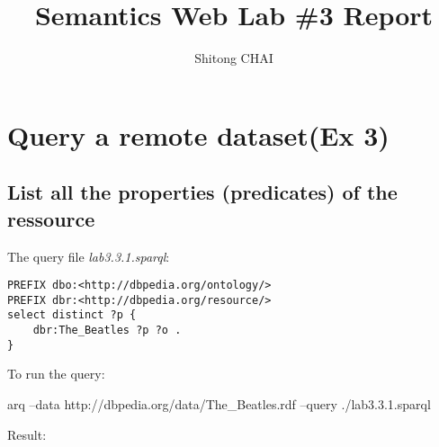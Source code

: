 \documentclass[a4paper, 12pt]{report}
\title{Semantics Web Lab \#3 Report}
\date{}
\author{Shitong CHAI}
\begin{document}
\maketitle
\tableofcontents

\chapter{Query a remote dataset(Ex 3)}
\section{List all the properties (predicates) of the ressource}
The query file \emph{lab3.3.1.sparql}:
\begin{lstlisting}[frame=single]
PREFIX dbo:<http://dbpedia.org/ontology/>
PREFIX dbr:<http://dbpedia.org/resource/>
select distinct ?p {
    dbr:The_Beatles ?p ?o .
}
\end{lstlisting}
To run the query:
\begin{commandshell}
    arq --data http://dbpedia.org/data/The_Beatles.rdf --query ./lab3.3.1.sparql
\end{commandshell}
Result:
\end{document}
